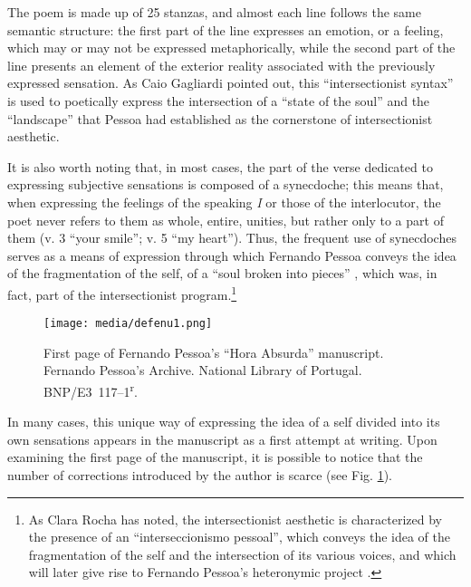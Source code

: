 \documentclass{article}
\begin{document}
The poem is made up of 25 stanzas, and almost each line follows the same
semantic structure: the first part of the line expresses an
emotion, or a feeling, which may or may not be expressed metaphorically,
while the second part of the line presents an element of the exterior
reality associated with the previously expressed sensation. As Caio
Gagliardi pointed out, this ``intersectionist syntax'' \parencite[97]{gagliardi_fernando_2005} is
used to poetically express the intersection of a ``state of the soul''
and the ``landscape'' that Pessoa had established as the cornerstone of
intersectionist aesthetic.

It is also worth noting that, in most cases, the part of the verse
dedicated to expressing subjective sensations is composed of a
synecdoche; this means that, when expressing the feelings of the
speaking \emph{I} or those of the interlocutor, the poet never refers to
them as whole, entire, unities, but rather only to a part of them (v. 3
``your smile''; v. 5 ``my heart''). Thus, the frequent use of
synecdoches serves as a means of expression through which Fernando
Pessoa conveys the idea of the fragmentation of the self, of a ``soul
broken into pieces'' \parencite[152]{pessoa_sensacionismo_2009}, which was, in fact, part of the
intersectionist program.\footnote{As Clara Rocha has noted, the
  intersectionist aesthetic is characterized by the presence of an
  ``interseccionismo pessoal'', which conveys the idea of the
  fragmentation of the self and the intersection of its various voices,
  and which will later give rise to Fernando Pessoa's heteronymic
  project \parencite[259]{rocha_revistas_1985}.}

\begin{figure}
    \centering
    \texttt{[image: media/defenu1.png]}
    \caption{First page of Fernando Pessoa's ``Hora Absurda'' manuscript. Fernando Pessoa's Archive. National Library of Portugal. BNP/E3~117--1\textsuperscript{r}.}
    \label{fig:defenu1}
\end{figure}

In many cases, this unique way of expressing the idea of a self divided
into its own sensations appears in the manuscript as a first attempt at
writing. Upon examining the first page of the manuscript, it is possible
to notice that the number of corrections introduced by the author is
scarce (see Fig. \ref{fig:defenu1}).
\end{document}
